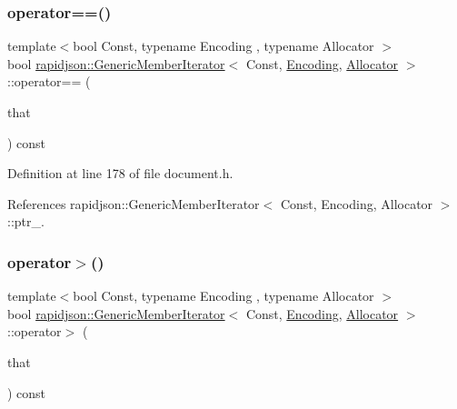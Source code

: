 \subsubsection{\texorpdfstring{operator==()}{operator==()}}
{\footnotesize\ttfamily template$<$bool Const, typename Encoding , typename Allocator $>$ \\
bool \mbox{\hyperlink{classrapidjson_1_1_generic_member_iterator}{rapidjson\+::\+Generic\+Member\+Iterator}}$<$ Const, \mbox{\hyperlink{classrapidjson_1_1_encoding}{Encoding}}, \mbox{\hyperlink{classrapidjson_1_1_allocator}{Allocator}} $>$\+::operator== (\begin{DoxyParamCaption}\item[{\mbox{\hyperlink{classrapidjson_1_1_generic_member_iterator_a61b9a9ba8a5917d90406532f104605cc}{Const\+Iterator}}}]{that }\end{DoxyParamCaption}) const}



Definition at line 178 of file document.\+h.


\begin{DoxyCode}{0}

\end{DoxyCode}


References rapidjson\+::\+Generic\+Member\+Iterator$<$ Const, Encoding, Allocator $>$\+::ptr\+\_\+.

\mbox{\label{classrapidjson_1_1_generic_member_iterator_afeb581725f6ae68ed508803e73295a14}} 
\subsubsection{\texorpdfstring{operator$>$()}{operator>()}}
{\footnotesize\ttfamily template$<$bool Const, typename Encoding , typename Allocator $>$ \\
bool \mbox{\hyperlink{classrapidjson_1_1_generic_member_iterator}{rapidjson\+::\+Generic\+Member\+Iterator}}$<$ Const, \mbox{\hyperlink{classrapidjson_1_1_encoding}{Encoding}}, \mbox{\hyperlink{classrapidjson_1_1_allocator}{Allocator}} $>$\+::operator$>$ (\begin{DoxyParamCaption}\item[{\mbox{\hyperlink{classrapidjson_1_1_generic_member_iterator_a61b9a9ba8a5917d90406532f104605cc}{Const\+Iterator}}}]{that }\end{DoxyParamCaption}) const}



